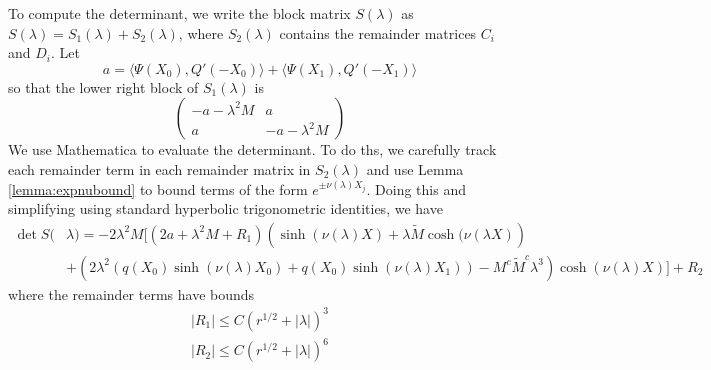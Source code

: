 \documentclass[thesis.tex]{subfiles}
\begin{document}
To compute the determinant, we write the block matrix $S(\lambda)$ as $S(\lambda) = S_1(\lambda) + S_2(\lambda)$, where $S_2(\lambda)$ contains the remainder matrices $C_i$ and $D_i$. Let
\[
a = \langle \Psi(X_0), Q'(-X_0) \rangle + \langle \Psi(X_1), Q'(-X_1) \rangle
\]
so that the lower right block of $S_1(\lambda)$ is
\[
\begin{pmatrix}
-a - \lambda^2 M & a \\
a & -a - \lambda^2 M
\end{pmatrix}
\]
We use Mathematica to evaluate the determinant. To do ths, we carefully track each remainder term in each remainder matrix in $S_2(\lambda)$ and use Lemma \ref{lemma:expnubound} to bound terms of the form $e^{\pm \nu(\lambda)X_j}$. Doing this and simplifying using standard hyperbolic trigonometric identities, we have
\begin{equation*}
\begin{aligned}
\det S(&\lambda) = -2 \lambda^2 M \Bigg[ \left( 2a + \lambda^2 M + R_1 \right)\left( \sinh(\nu(\lambda)X) + \lambda \tilde{M} \cosh( \nu(\lambda X) \right) \\
&+ \left( 2 \lambda^2 (q(X_0) \sinh( \nu(\lambda)X_0) + q(X_0) \sinh( \nu(\lambda)X_1)) - M^c \tilde{M}^c \lambda^3 \right)\cosh(\nu(\lambda)X) \Bigg] + R_2
\end{aligned}
\end{equation*}
where the remainder terms have bounds 
\begin{align*}
|R_1| \leq C(r^{1/2} + |\lambda|)^3 \\
|R_2| \leq C(r^{1/2} + |\lambda|)^6
\end{align*}
\end{document}
